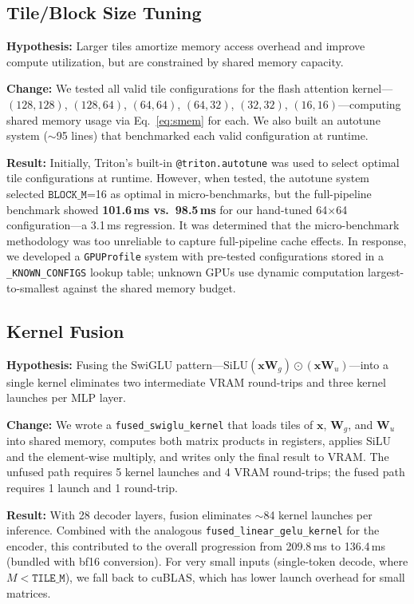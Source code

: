 \documentclass{article}
\begin{document}
\subsection{Tile/Block Size Tuning}

\textbf{Hypothesis:} Larger tiles amortize memory access overhead and improve compute utilization, but are constrained by shared memory capacity.

\textbf{Change:} We tested all valid tile configurations for the flash attention kernel---$(128,128)$, $(128,64)$, $(64,64)$, $(64,32)$, $(32,32)$, $(16,16)$---computing shared memory usage via Eq.~\ref{eq:smem} for each.  We also built an autotune system ($\sim$95 lines) that benchmarked each valid configuration at runtime.

\textbf{Result:} Initially, Triton's built-in \texttt{@triton.autotune} was used to select optimal tile configurations at runtime.  However, when tested, the autotune system selected $\texttt{BLOCK\_M}$=16 as optimal in micro-benchmarks, but the full-pipeline benchmark showed \textbf{101.6\,ms vs.\ 98.5\,ms} for our hand-tuned 64$\times$64 configuration---a 3.1\,ms regression.  It was determined that the micro-benchmark methodology was too unreliable to capture full-pipeline cache effects.
In response, we developed a \texttt{GPUProfile} system with pre-tested configurations stored in a \texttt{\_KNOWN\_CONFIGS} lookup table; unknown GPUs use dynamic computation largest-to-smallest against the shared memory budget.

\subsection{Kernel Fusion}\label{sec:fusion}

\textbf{Hypothesis:} Fusing the SwiGLU pattern---$\text{SiLU}(\mathbf{x} \mathbf{W}_g) \odot (\mathbf{x} \mathbf{W}_u)$---into a single kernel eliminates two intermediate VRAM round-trips and three kernel launches per MLP layer.

\textbf{Change:} We wrote a \texttt{fused\_swiglu\_kernel} that loads tiles of $\mathbf{x}$, $\mathbf{W}_g$, and $\mathbf{W}_u$ into shared memory, computes both matrix products in registers, applies SiLU and the element-wise multiply, and writes only the final result to VRAM.  The unfused path requires 5 kernel launches and 4 VRAM round-trips; the fused path requires 1 launch and 1 round-trip.

\textbf{Result:} With 28 decoder layers, fusion eliminates $\sim$84 kernel launches per inference.  Combined with the analogous \texttt{fused\_linear\_gelu\_kernel} for the encoder, this contributed to the overall progression from 209.8\,ms to 136.4\,ms (bundled with bf16 conversion).  For very small inputs (single-token decode, where $M < \texttt{TILE\_M}$), we fall back to cuBLAS, which has lower launch overhead for small matrices.
\end{document}
